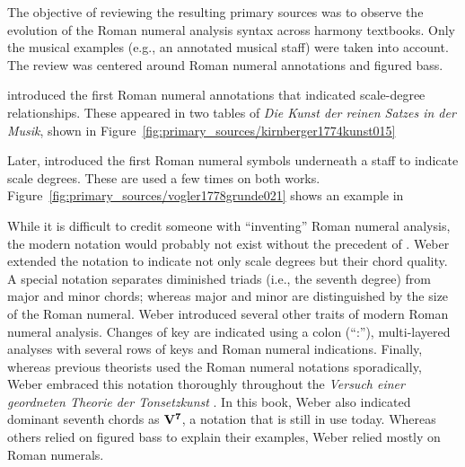 The objective of reviewing the resulting primary sources was to observe the evolution of the Roman numeral analysis syntax across harmony textbooks.
Only the musical examples (e.g., an annotated musical staff) were taken into account.
The review was centered around Roman numeral annotations and figured bass.

\textcite{kirnberger1774kunst} introduced the first Roman numeral annotations that indicated scale-degree relationships.
These appeared in two tables of \emph{Die Kunst der reinen Satzes in der Musik}, shown in Figure~\ref{fig:primary_sources/kirnberger1774kunst015}


Later, \textcite{vogler1778grunde, vogler1802handbuch} introduced the first Roman numeral symbols underneath a staff to indicate scale degrees.
These are used a few times on both works.
Figure~\ref{fig:primary_sources/vogler1778grunde021} shows an example in \textcite{vogler1778grunde}


While it is difficult to credit someone with ``inventing'' Roman numeral analysis, the modern notation would probably not exist without the precedent of \textcite{weber1817versuch}.
Weber extended the notation to indicate not only scale degrees but their chord quality.
A special notation separates diminished triads (i.e., the seventh degree) from major and minor chords; whereas major and minor are distinguished by the size of the Roman numeral.
Weber introduced several other traits of modern Roman numeral analysis.
Changes of key are indicated using a colon (``:''), multi-layered analyses with several rows of keys and Roman numeral indications.
Finally, whereas previous theorists used the Roman numeral notations sporadically, Weber embraced this notation thoroughly throughout the \emph{Versuch einer geordneten Theorie der Tonsetzkunst} \parencite{weber1817versuch}.
In this book, Weber also indicated dominant seventh chords as $\textbf{V}\relax\relax{\footnotesize {}^\textbf{7}\relax\relax}$, a notation that is still in use today.
Whereas others relied on figured bass to explain their examples, Weber relied mostly on Roman numerals.


